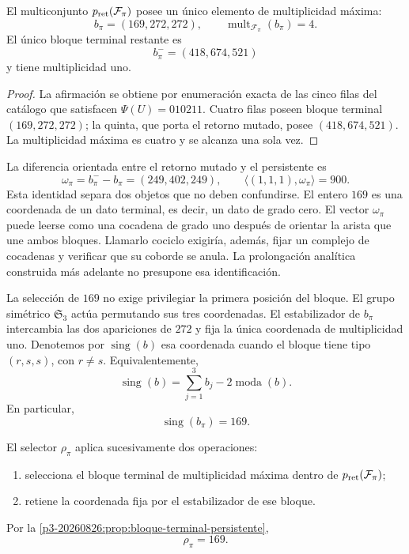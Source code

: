 \begin{proposition}
\label{p3-20260826:prop:bloque-terminal-persistente}
El multiconjunto \(p_{\rm ret}(\mathcal F_\pi)\) posee un único elemento de
multiplicidad máxima:
\[
b_\pi=(169,272,272),
\qquad
\operatorname{mult}_{\mathcal F_\pi}(b_\pi)=4.
\]
El único bloque terminal restante es
\[
b_\pi^-=(418,674,521)
\]
y tiene multiplicidad uno.
\end{proposition}

\begin{proof}
La afirmación se obtiene por enumeración exacta de las cinco filas del
catálogo que satisfacen \(\Psi(U)=010211\). Cuatro filas poseen bloque
terminal \((169,272,272)\); la quinta, que porta el retorno mutado, posee
\((418,674,521)\). La multiplicidad máxima es cuatro y se alcanza una sola
vez.
\end{proof}

La diferencia orientada entre el retorno mutado y el persistente es
\[
 \omega_\pi=b_\pi^- - b_\pi=(249,402,249),
 \qquad
 \langle(1,1,1),\omega_\pi\rangle=900.
\]
Esta identidad separa dos objetos que no deben confundirse. El entero
\(169\) es una coordenada de un dato terminal, es decir, un dato de grado
cero. El vector \(\omega_\pi\) puede leerse como una cocadena de grado uno
después de orientar la arista que une ambos bloques. Llamarlo cociclo exigiría,
además, fijar un complejo de cocadenas y verificar que su coborde se anula.
La prolongación analítica construida más adelante no presupone esa
identificación.

La selección de \(169\) no exige privilegiar la primera posición del bloque.
El grupo simétrico \(\mathfrak S_3\) actúa permutando sus tres coordenadas.
El estabilizador de \(b_\pi\) intercambia las dos apariciones de \(272\) y
fija la única coordenada de multiplicidad uno. Denotemos por
\(\operatorname{sing}(b)\) esa coordenada cuando el bloque tiene tipo
\((r,s,s)\), con \(r\ne s\). Equivalentemente,
\[
\operatorname{sing}(b)
=\sum_{j=1}^3b_j-2\operatorname{moda}(b).
\]
En particular,
\[
\boxed{\operatorname{sing}(b_\pi)=169.}
\]

\begin{definition}
\label{p3-20260826:def:selector-residual-pi}
El selector \(\rho_\pi\) aplica sucesivamente dos operaciones:
\begin{enumerate}
  \item selecciona el bloque terminal de multiplicidad máxima dentro de
  \(p_{\rm ret}(\mathcal F_\pi)\);
  \item retiene la coordenada fija por el estabilizador de ese bloque.
\end{enumerate}
Por la \cref{p3-20260826:prop:bloque-terminal-persistente},
\[
\boxed{\rho_\pi=169.}
\]
\end{definition}

